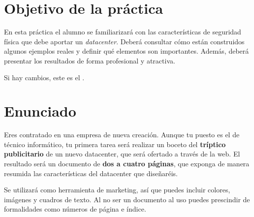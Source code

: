 
\usepackage{eurosym}
\usepackage{needspace}




\renewcommand{\hmwkTitle}{Publicidad de datacenter}
\renewcommand{\hmwkClass}{Seguridad Informática}

\usepackage{blindtext}








\section{Objetivo de la práctica}
En esta práctica el alumno se familiarizará con las características de seguridad física que debe aportar un \textit{datacenter}. Deberá consultar cómo están construidos algunos ejemplos reales y definir qué elementos son importantes. Además, deberá presentar los resultados de forma profesional y atractiva.

Si hay cambios, este es el  .




\section{Enunciado}
Eres contratado en una empresa de nueva creación. Aunque tu puesto es el de técnico informático, tu primera tarea será realizar un boceto del \textbf{tríptico publicitario} de un nuevo datacenter, que será ofertado a través de la web.  El resultado será un documento de \textbf{dos a cuatro páginas}, que exponga de manera resumida las características del datacenter que diseñaréis.

Se utilizará como herramienta de marketing, así que puedes incluir colores, imágenes y cuadros de texto. Al no ser un documento al uso puedes prescindir de formalidades como números de página e índice.

